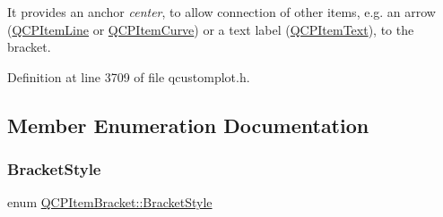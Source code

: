 It provides an anchor {\itshape center}, to allow connection of other items, e.\+g. an arrow (\hyperlink{class_q_c_p_item_line}{Q\+C\+P\+Item\+Line} or \hyperlink{class_q_c_p_item_curve}{Q\+C\+P\+Item\+Curve}) or a text label (\hyperlink{class_q_c_p_item_text}{Q\+C\+P\+Item\+Text}), to the bracket. 

Definition at line 3709 of file qcustomplot.\+h.



\subsection{Member Enumeration Documentation}
\mbox{\label{class_q_c_p_item_bracket_a7ac3afd0b24a607054e7212047d59dbd}} 
\subsubsection{\texorpdfstring{Bracket\+Style}{BracketStyle}}
{\footnotesize\ttfamily enum \hyperlink{class_q_c_p_item_bracket_a7ac3afd0b24a607054e7212047d59dbd}{Q\+C\+P\+Item\+Bracket\+::\+Bracket\+Style}}

